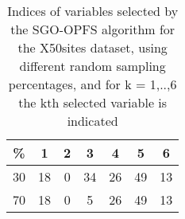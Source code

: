 \begin{table}
	\begin{center}
		\begin{tabular}{c c c c c c c}
			\% & 1 & 2 & 3 & 4 & 5 & 6 \\
			\hline
			30 & 18 & 0 & 34 & 26 & 49 & 13 \\
			70 & 18 & 0 & 5 & 26 & 49 & 13 \\
		\end{tabular}
	\end{center}
	\caption{Indices of variables selected by the SGO-OPFS algorithm for the X50sites dataset, using different random sampling percentages, and for k = 1,..,6 the kth selected variable is indicated}
\end{table}